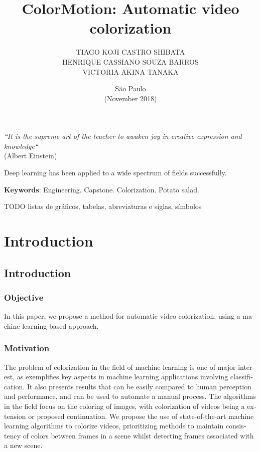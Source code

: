 \documentclass[12pt,openright,twoside,a4paper,english]{abntex2}
\author{TIAGO KOJI CASTRO SHIBATA\\
HENRIQUE CASSIANO SOUZA BARROS\\
VICTORIA AKINA TANAKA}
\title{ColorMotion: Automatic video colorization}
\date{São Paulo\\(November 2018)}
\begin{document}
\begin{otherlanguage}{english}

\imprimircapa
\imprimirfalsafolhaderosto
\imprimirfolhaderosto

\begin{epigrafe}
\begin{flushright}
\vspace*{\fill}
\textit{``It is the supreme art of the teacher to awaken joy in creative expression and knowledge``}\\
(Albert Einstein)
\par
\end{flushright}
\end{epigrafe}

\begin{resumo}
Deep learning has been applied to a wide spectrum of fields successfully.
\vspace{\onelineskip}

\noindent
\textbf{Keywords}: Engineering. Capstone. Colorization. Potato salad.
\end{resumo}

TODO listas de gráficos, tabelas, abreviaturas e siglas, símbolos

\tableofcontents

\maketitle

\chapter{Introduction}
\section{Introduction}

\subsection{Objective}
In this paper, we propose a method for automatic video colorization, using a machine learning-based approach.

\subsection{Motivation} \label{sec:Motivation}
The problem of colorization in the field of machine learning is one of major interest, as exemplifies key aspects in machine learning applications involving classification. It also presents results that can be easily compared to human perception and performance, and can be used to automate a manual process. The algorithms in the field focus on the coloring of images, with colorization of videos being a extension or proposed continuation. We propose the use of state-of-the-art machine learning algorithms to colorize videos, prioritizing methods to maintain consistency of colors between frames in a scene whilst detecting frames associated with a new scene.


\end{otherlanguage}
\end{document}
